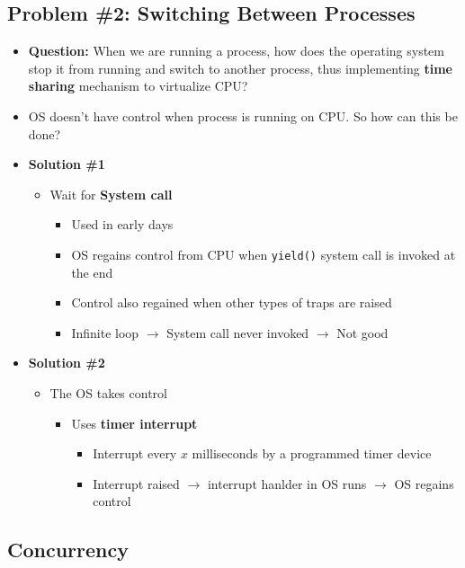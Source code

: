 \documentclass[12pt]{article}
\begin{document}
\subsection{Problem \#2: Switching Between Processes}
\begin{itemize}
    \item \textbf{Question:} When we are running a process, how does the operating system stop it
    from running and switch to another process, thus implementing \textbf{time sharing} mechanism
    to virtualize CPU?
    \item OS doesn't have control when process is running on CPU. So how can this be done?
    \item \textbf{Solution \#1}
    \begin{itemize}
        \item Wait for \textbf{System call}
        \begin{itemize}
            \item Used in early days
            \item OS regains control from CPU when \texttt{yield()} system call is invoked at the end
            \item Control also regained when other types of traps are raised
            \item Infinite loop $\to$ System call never invoked $\to$ Not good
        \end{itemize}
    \end{itemize}
    \item \textbf{Solution \#2}
    \begin{itemize}
        \item The OS takes control
        \begin{itemize}
            \item Uses \textbf{timer interrupt}
            \begin{itemize}
                \item Interrupt every $x$ milliseconds by a programmed timer device
                \item Interrupt raised $\to$ interrupt hanlder in OS runs $\to$ OS regains control
            \end{itemize}
        \end{itemize}
    \end{itemize}
\end{itemize}

\subsection{Concurrency}
\end{document}
